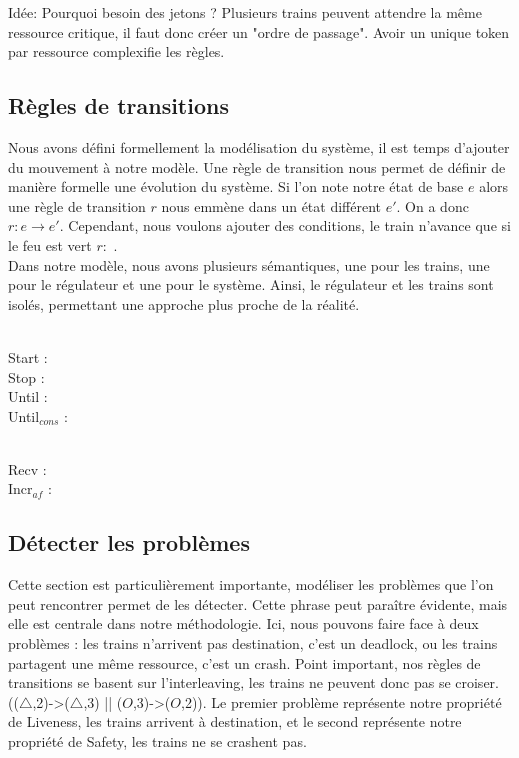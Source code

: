 \documentclass[runningheads]{llncs}
\begin{document}
Idée: Pourquoi besoin des jetons ? Plusieurs trains peuvent attendre la même ressource critique, il faut donc créer un "ordre de passage".
Avoir un unique token par ressource complexifie les règles.


\subsection{Règles de transitions}
Nous avons défini formellement la modélisation du système, il est temps d'ajouter du mouvement à notre modèle.
Une règle de transition nous permet de définir de manière formelle une évolution du système. 
Si l'on note notre état de base $e$ alors une règle de transition $r$ nous emmène dans un état différent $e'$. On a donc $r: e \rightarrow e'$.
Cependant, nous voulons ajouter des conditions, le train n'avance que si le feu est vert $r:$ .
\\Dans notre modèle, nous avons plusieurs sémantiques, une pour les trains, une pour le régulateur et une pour le système.
Ainsi, le régulateur et les trains sont isolés, permettant une approche plus proche de la réalité.

\noindent
\\Start : 
\\Stop : 
\\Until : 
\\Until$_{cons}$ : 

\noindent
\\Recv : 
\\Incr$_{af}$ :



\subsection{Détecter les problèmes}
Cette section est particulièrement importante, modéliser les problèmes que l'on peut rencontrer permet de les détecter.
Cette phrase peut paraître évidente, mais elle est centrale dans notre méthodologie. Ici, nous pouvons faire face à deux problèmes : 
les trains n'arrivent pas destination, c'est un deadlock, ou les trains partagent une même ressource, c'est un crash. 
Point important, nos règles de transitions se basent sur l'interleaving, les trains ne peuvent donc pas se croiser. (($\triangle$,2)->($\triangle$,3) || ($O$,3)->($O$,2)).
Le premier problème représente notre propriété de Liveness, les trains arrivent à destination, et le second représente notre propriété de Safety, les trains ne se crashent pas.
\end{document}
